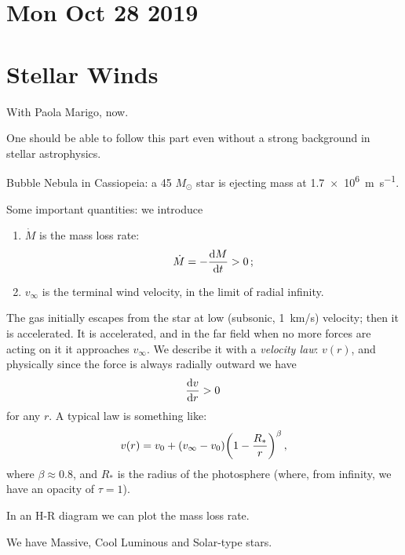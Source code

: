 \documentclass[main.tex]{subfiles}
\begin{document}
\section*{Mon Oct 28 2019}

\section{Stellar Winds}

With Paola Marigo, now.

One should be able to follow this part even without a strong background in stellar astrophysics.

Bubble Nebula in Cassiopeia: a 45 \(M_{\odot}\) star is ejecting mass at \SI{1.7e6}{m\per\second}.

Some important quantities: we introduce 

\begin{enumerate}
    \item \(\dot{M}\) is the mass loss rate: 
    \begin{equation}
      \dot{M} = - \dv{M}{t} >0
    \,;
    \end{equation}
    \item \(v_{\infty}\) is the terminal wind velocity, in the limit of radial infinity.
\end{enumerate}

The gas initially escapes from the star at low (subsonic, \SI{1}{km/s}) velocity; then it is accelerated.
It is accelerated, and in the far field when no more forces are acting on it it approaches \(v_{\infty}\).
We describe it with a \emph{velocity law}: \(v(r)\), and physically since the force is always radially outward we have 
%
\begin{equation}
  \dv{v}{r} > 0
\,
\end{equation}
%
for any \(r\). A typical law is something like: 
%
\begin{equation}
  v(r) = v_0 + \qty(v_{\infty}-v_{0} ) \qty(1 - \frac{R_{*}}{r})^{\beta }
\,,
\end{equation}
%
where \(\beta \approx 0.8\), and \(R_{*}\) is the radius of the photosphere (where, from infinity, we have an opacity of \(\tau = 1\)).

In an H-R diagram we can plot the mass loss rate.


We have Massive, Cool Luminous and Solar-type stars. 
\end{document}
